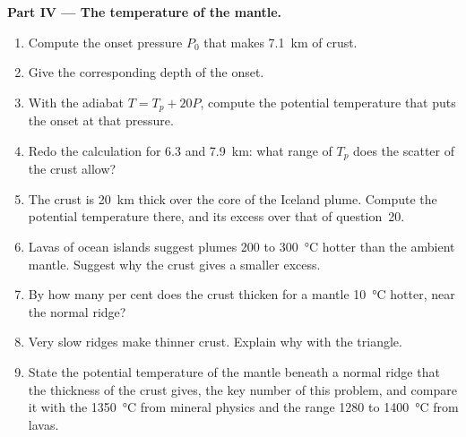 \begin{problem}
\noindent\textbf{Part IV --- The temperature of the mantle.}
\begin{enumerate}[resume]
\item Compute the onset pressure $P_0$ that makes \qty{7.1}{km} of crust.
\item Give the corresponding depth of the onset.
\item With the adiabat $T = T_p + 20P$, compute the potential temperature that
puts the onset at that pressure.
\item Redo the calculation for 6.3 and \qty{7.9}{km}: what range of $T_p$ does the
scatter of the crust allow?
\item The crust is \qty{20}{km} thick over the core of the Iceland plume. Compute
the potential temperature there, and its excess over that of question~20.
\item Lavas of ocean islands suggest plumes 200 to \qty{300}{\celsius} hotter than
the ambient mantle. Suggest why the crust gives a smaller excess.
\item By how many per cent does the crust thicken for a mantle \qty{10}{\celsius}
hotter, near the normal ridge?
\item Very slow ridges make thinner crust. Explain why with the triangle.
\item State the potential temperature of the mantle beneath a normal ridge that
the thickness of the crust gives, the key number of this problem, and compare
it with the \qty{1350}{\celsius} from mineral physics and the range 1280 to
\qty{1400}{\celsius} from lavas.
\end{enumerate}
\end{problem}

